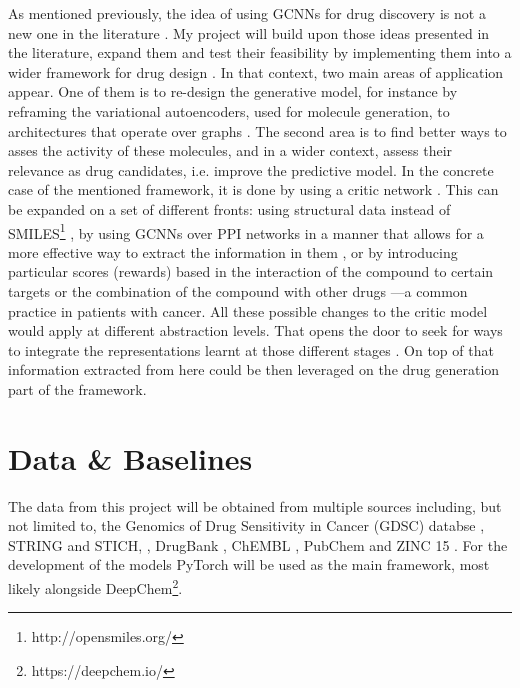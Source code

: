 \documentclass{article}
\begin{document}
As mentioned previously, the idea of using GCNNs for drug discovery is not a new one in
 the literature \cite{Sun2019}. My project will build upon those ideas presented in the
 literature, expand them and test their feasibility by implementing them into a wider
 framework for drug design \cite{Born2019}. In that context, two main areas of
 application appear. One of them is to re-design the generative model, for instance by
 reframing the variational autoencoders, used for molecule generation, to architectures
 that operate over graphs \cite{Simonovsky2018,Li2018, Li2018a}. The second area is to
 find better ways to asses the activity of these molecules, and in a wider context,
 assess their relevance as drug candidates, i.e. improve the predictive model. In the
 concrete case of the mentioned framework, it is done by using a critic network
 \cite{Manica2019}. This can be expanded on a set of different fronts: using structural
 data instead of SMILES\footnote{http://opensmiles.org/} \cite{Li, Do2019}, {\color{red}
 by using GCNNs over PPI networks in a manner that allows for a more effective way to
 extract the information in them} \cite{Oskooei2019, Wang2019}, or by introducing
 particular scores (rewards) based in the interaction of the compound to certain targets
 \cite{YingkaiGao2018, Zhavoronkov2019} or the combination of the compound with other
 drugs \cite{Zitnik2018}---a common practice in patients with cancer. All these possible
 changes to the critic model would apply at different abstraction levels. That opens the
 door to seek for ways to integrate the representations learnt at those different stages
 \cite{Ying2018, Ma2019, Huang2019}. On top of that information extracted from here
 could be then leveraged on the drug generation part of the framework.


    \section*{Data \& Baselines}

The data from this project will be obtained from multiple sources including, but not
 limited to, the Genomics of Drug Sensitivity in Cancer (GDSC) databse \cite{Yang2013},
 STRING and STICH, \cite{Szklarczyk2019,Szklarczyk2016}, DrugBank \cite{Wishart2006},
 ChEMBL \cite{Gaulton2017}, PubChem \cite{Kim2019} and ZINC 15 \cite{Sterling2015}. For
 the development of the models PyTorch \cite{Paszke2019} will be used as the main
 framework, most likely alongside DeepChem\footnote{https://deepchem.io/}.
\end{document}
